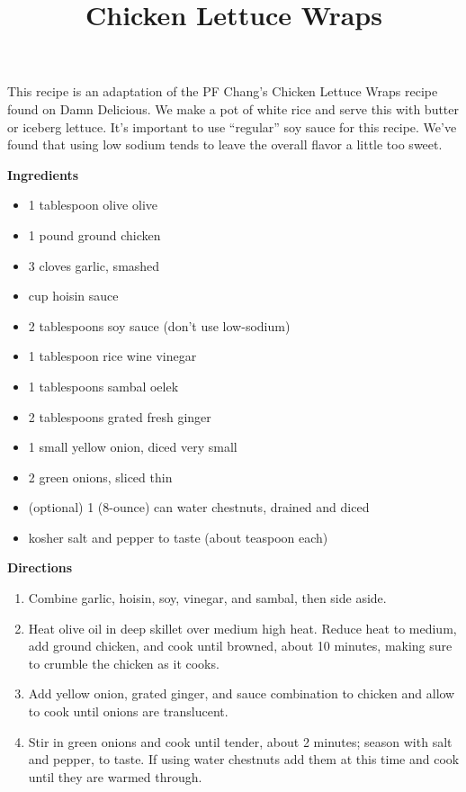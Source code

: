 \documentclass{article}
\title{Chicken Lettuce Wraps}
\begin{document}
This recipe is an adaptation of the PF Chang's Chicken Lettuce Wraps
recipe found on Damn Delicious. We make a pot of white rice and serve
this with butter or iceberg lettuce. It's important to use ``regular''
soy sauce for this recipe. We've found that using low sodium tends
to leave the overall flavor a little too sweet.

\bigskip

\textbf{Ingredients}

\begin{itemize}
      \item 1 tablespoon olive olive
      \item 1 pound ground chicken
      \item 3 cloves garlic, smashed
      \item {} cup hoisin sauce
      \item 2 tablespoons soy sauce (don't use low-sodium)
      \item 1 tablespoon rice wine vinegar
      \item 1 tablespoons sambal oelek
      \item 2 tablespoons grated fresh ginger
      \item 1 small yellow onion, diced very small
      \item 2 green onions, sliced thin
      \item (optional) 1 (8-ounce) can water chestnuts, drained and diced
      \item kosher salt and pepper to taste (about  teaspoon each)
\end{itemize}

\bigskip

\textbf{Directions}

\begin{enumerate}
      \item Combine garlic, hoisin, soy, vinegar, and sambal, then side aside.
      \item Heat olive oil in deep skillet over medium high heat. Reduce heat to medium, add ground chicken,
            and cook until browned, about 10 minutes, making sure to crumble the chicken as it cooks.
      \item Add yellow onion, grated ginger, and sauce combination to chicken and allow to cook until
            onions are translucent.
      \item Stir in green onions and cook until tender, about 2 minutes; season with salt
            and pepper, to taste. If using water chestnuts add them at this time and cook
            until they are warmed through.
\end{enumerate}

\end{document}
